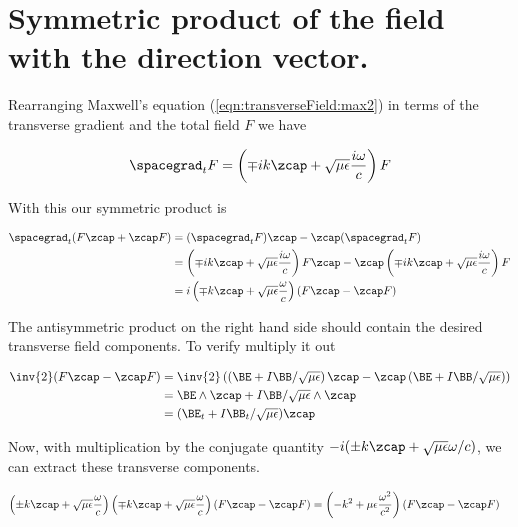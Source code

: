 \section{Symmetric product of the field with the direction vector.}

Rearranging Maxwell's equation (\ref{eqn:transverseField:max2}) in terms of the transverse gradient and the total field $F$ we have

\begin{align}\label{eqn:transverseField:blah9}
\spacegrad_t F = \left( \mp i k \zcap + \sqrt{\mu\epsilon}\frac{i\omega}{c}\right) F
\end{align}

With this our symmetric product is

\begin{align*}
\spacegrad_t ( F \zcap + \zcap F) 
&= (\spacegrad_t F) \zcap - \zcap (\spacegrad_t F) \\
&=
\left( \mp i k \zcap + \sqrt{\mu\epsilon}\frac{i\omega}{c}\right) F \zcap
- \zcap \left( \mp i k \zcap + \sqrt{\mu\epsilon}\frac{i\omega}{c}\right) F \\
&=
i \left( \mp k \zcap + \sqrt{\mu\epsilon}\frac{\omega}{c}\right) (F \zcap - \zcap F) \\
\end{align*}

The antisymmetric product on the right hand side should contain the desired transverse field components.  To verify multiply it out

\begin{align*}
\inv{2}(F \zcap - \zcap F)  
&=
\inv{2}\left( \left(\BE + I \BB/\sqrt{\mu\epsilon}\right) \zcap - \zcap \left(\BE + I \BB/\sqrt{\mu\epsilon}\right) \right)  \\
&=
\BE \wedge \zcap + I \BB/\sqrt{\mu\epsilon} \wedge \zcap \\
&=
(\BE_t + I \BB_t/\sqrt{\mu\epsilon}) \zcap \\
\end{align*}

Now, with multiplication by the conjugate quantity $-i(\pm k \zcap + \sqrt{\mu\epsilon}\omega/c)$, we can extract these transverse components.

\begin{align*}
\left( \pm k \zcap + \sqrt{\mu\epsilon}\frac{\omega}{c}\right) \left( \mp k \zcap + \sqrt{\mu\epsilon}\frac{\omega}{c}\right) (F \zcap - \zcap F) &=
\left( -k^2 + {\mu\epsilon}\frac{\omega^2}{c^2}\right) (F \zcap - \zcap F) 
\end{align*}

